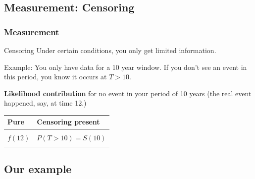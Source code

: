 \documentclass[usenames,dvipsnames]{beamer}
\begin{document}
\subsection{Measurement: Censoring}
\begin{frame}
\frametitle{Measurement}

\begin{block}{Censoring}
Under certain conditions, you only get limited information.
\end{block}

Example: You only have data for a 10 year window. If you don't see an event in this period, you know it occurs at $T>10$.

\textbf{Likelihood contribution} for no event in your period of 10 years (the real event happened, say, at time 12.)
\begin{center}
\begin{tabular}{|p{4cm}|p{4cm}|}
   \hline
   Pure         & Censoring present \\
   \hline
                 &            \\
   $f(12)$ & $P(T > 10) = S(10)$ \\
                 &            \\
   \hline
\end{tabular}

\vfill
{}

\end{center}
\end{frame}



\subsection{Our example}
\end{document}

